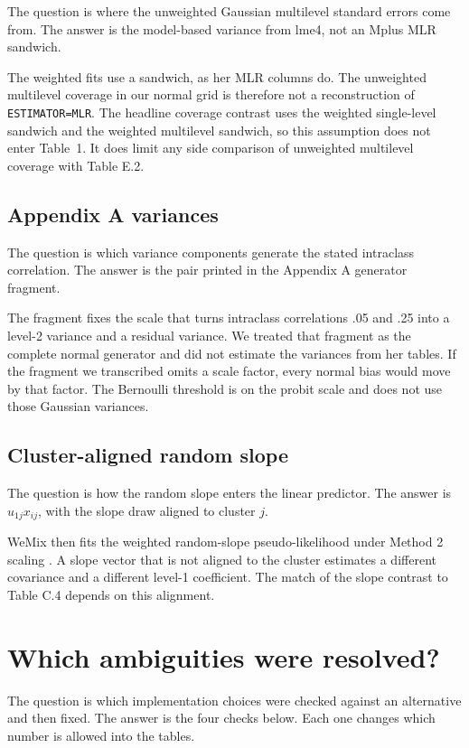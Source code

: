 The question is where the unweighted Gaussian multilevel standard errors come
from.
The answer is the model-based variance from lme4, not an Mplus MLR sandwich.

The weighted fits use a sandwich, as her MLR columns do.
The unweighted multilevel coverage in our normal grid is therefore not a
reconstruction of \texttt{ESTIMATOR=MLR}.
The headline coverage contrast uses the weighted single-level sandwich and the
weighted multilevel sandwich, so this assumption does not enter Table~1.
It does limit any side comparison of unweighted multilevel coverage with
Table E.2.

\subsection{Appendix A variances}

The question is which variance components generate the stated intraclass
correlation.
The answer is the pair printed in the Appendix A generator fragment.

The fragment fixes the scale that turns intraclass correlations .05 and .25
into a level-2 variance and a residual variance.
We treated that fragment as the complete normal generator and did not estimate
the variances from her tables.
If the fragment we transcribed omits a scale factor, every normal bias would
move by that factor.
The Bernoulli threshold is on the probit scale and does not use those
Gaussian variances.

\subsection{Cluster-aligned random slope}

The question is how the random slope enters the linear predictor.
The answer is $u_{1j} x_{ij}$, with the slope draw aligned to cluster $j$.

WeMix then fits the weighted random-slope pseudo-likelihood under Method 2
scaling \citep{bailey2023}.
A slope vector that is not aligned to the cluster estimates a different
covariance and a different level-1 coefficient.
The match of the slope contrast to Table C.4 depends on this alignment.

\section{Which ambiguities were resolved?}

The question is which implementation choices were checked against an
alternative and then fixed.
The answer is the four checks below.
Each one changes which number is allowed into the tables.

